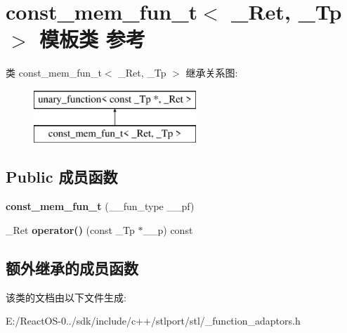 \hypertarget{classconst__mem__fun__t}{}\section{const\+\_\+mem\+\_\+fun\+\_\+t$<$ \+\_\+\+Ret, \+\_\+\+Tp $>$ 模板类 参考}
\label{classconst__mem__fun__t}
类 const\+\_\+mem\+\_\+fun\+\_\+t$<$ \+\_\+\+Ret, \+\_\+\+Tp $>$ 继承关系图\+:\begin{figure}[H]
\begin{center}
\leavevmode
\includegraphics[height=2.000000cm]{classconst__mem__fun__t}
\end{center}
\end{figure}
\subsection*{Public 成员函数}
\begin{DoxyCompactItemize}
\item 
\mbox{\label{classconst__mem__fun__t_ab4ef49e1728bf4a30148d7436b3daacd}} 
{\bfseries const\+\_\+mem\+\_\+fun\+\_\+t} (\+\_\+\+\_\+fun\+\_\+type \+\_\+\+\_\+pf)
\item 
\mbox{\label{classconst__mem__fun__t_a23f004ca758acd553621871615bb95ec}} 
\+\_\+\+Ret {\bfseries operator()} (const \+\_\+\+Tp $\ast$\+\_\+\+\_\+p) const
\end{DoxyCompactItemize}
\subsection*{额外继承的成员函数}


该类的文档由以下文件生成\+:\begin{DoxyCompactItemize}
\item 
E\+:/\+React\+O\+S-\/0../sdk/include/c++/stlport/stl/\+\_\+function\+\_\+adaptors.\+h\end{DoxyCompactItemize}

